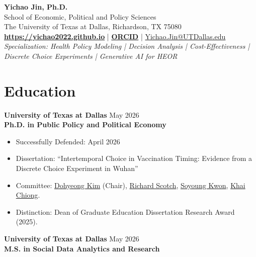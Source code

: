 \documentclass[11pt, letterpaper]{article}
\begin{document}
\thispagestyle{empty}
\pagestyle{empty}

\begin{center}
    {\huge \textbf{Yichao Jin, Ph.D.}} \\
    \vspace{0.5em}
    School of Economic, Political and Policy Sciences \\
    The University of Texas at Dallas, Richardson, TX 75080 \\
    \vspace{0.5em}
    \href{https://yichao2022.github.io}{\textbf{https://yichao2022.github.io}} \quad | \quad \href{https://orcid.org/0009-0003-7667-5143}{\textbf{ORCID}} \quad | \quad \href{mailto:Yichao.Jin@UTDallas.edu}{Yichao.Jin@UTDallas.edu} \\
    \vspace{0.5em}
    \textit{Specialization: Health Policy Modeling \;|\; Decision Analysis \;|\; Cost-Effectiveness \;|\; Discrete Choice Experiments \;|\; Generative AI for HEOR}
\end{center}

\vspace{0.5em}
\noindent\hrulefill

\section*{Education}
\textbf{University of Texas at Dallas} \hfill May 2026 \\
\textbf{Ph.D. in Public Policy and Political Economy}
\begin{itemize}[noitemsep, topsep=0pt, label={-}]
    \item Successfully Defended: April 2026
    \item Dissertation: ``Intertemporal Choice in Vaccination Timing: Evidence from a Discrete Choice Experiment in Wuhan''
    \item Committee: \href{https://profiles.utdallas.edu/dohyeong.kim}{Dohyeong Kim} (Chair), \href{https://profiles.utdallas.edu/richard.scotch}{Richard Scotch}, \href{https://profiles.utdallas.edu/soyoung.kwon}{Soyoung Kwon}, \href{https://jindal.utdallas.edu/faculty/khai-chiong/}{Khai Chiong}.
    \item Distinction: Dean of Graduate Education Dissertation Research Award (2025).
\end{itemize}

\vspace{0.5em}
\noindent \textbf{University of Texas at Dallas} \hfill May 2026 \\
\textbf{M.S. in Social Data Analytics and Research}
\end{document}
